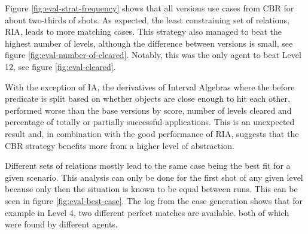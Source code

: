 Figure \ref{fig:eval-strat-frequency} shows that all versions use cases from \ac{CBR} for about two-thirds of shots. As expected, the least constraining set of relations, \ac{RIA}, leads to more matching cases. This strategy also managed to beat the highest number of levels, although the difference between versions is small, see figure \ref{fig:eval-number-of-cleared}. Notably, this was the only agent to beat Level 12, see figure \ref{fig:eval-cleared}.

With the exception of \ac{IA}, the derivatives of Interval Algebras where the before predicate is split based on whether objects are close enough to hit each other, performed worse than the base versions by score, number of levels cleared and percentage of totally or partially successful applications. This is an unexpected result and, in combination with the good performance of \ac{RIA}, suggests that the \ac{CBR} strategy benefits more from a higher level of abstraction.

Different sets of relations mostly lead to the same case being the best fit for a given scenario. This analysis can only be done for the first shot of any given level because only then the situation is known to be equal between runs. This can be seen in figure \ref{fig:eval-best-case}. The log from the case generation shows that for example in Level 4, two different perfect matches are available. both of which were found by different agents.


